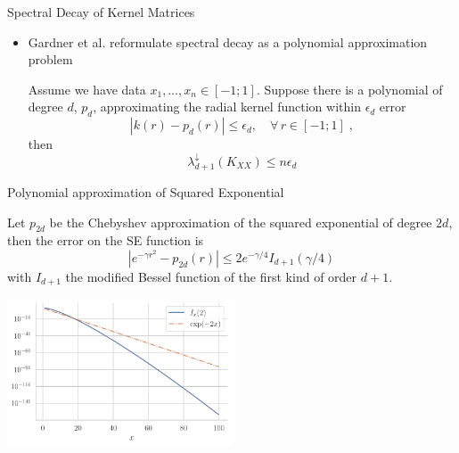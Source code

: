 \documentclass{beamer}
\begin{document}
\begin{frame}{Spectral Decay of Kernel Matrices}
\begin{itemize}
    \item Gardner et al. reformulate spectral decay as a polynomial approximation problem
    \begin{lemma}[1D data]
    Assume we have data $x_1, \ldots, x_n \in [-1; 1]$. Suppose there is a polynomial of degree $d$, $p_d$, approximating the radial kernel function within $\epsilon_d$ error
    \begin{equation*}
        |k(r) - p_d(r)| \le \epsilon_d, \quad \forall \, r \in [-1; 1] \; ,
    \end{equation*}
    then 
    \begin{equation*}
        \lambda_{d+1}^{\downarrow}(K_{XX}) \le n \epsilon_d
    \end{equation*}
    \end{lemma}
\end{itemize}
\end{frame}


\begin{frame}{Polynomial approximation of Squared Exponential}

    \begin{lemma}
    Let $p_{2d}$ be the Chebyshev approximation of the squared exponential of degree $2d$, then the error on the SE function is 
    \begin{equation*}
        |e^{-\gamma r^2} - p_{2d}(r)| \le 2 e^{-\gamma/4} I_{d+1}(\gamma/4)
    \end{equation*}
    with $I_{d+1}$ the modified Bessel function of the first kind of order $d+1$.
    \end{lemma}
    \pause
    \begin{center}
        \includegraphics[width=0.5\textwidth]{res/bessel_decay.pdf}
    \end{center}

\end{frame}
\end{document}
